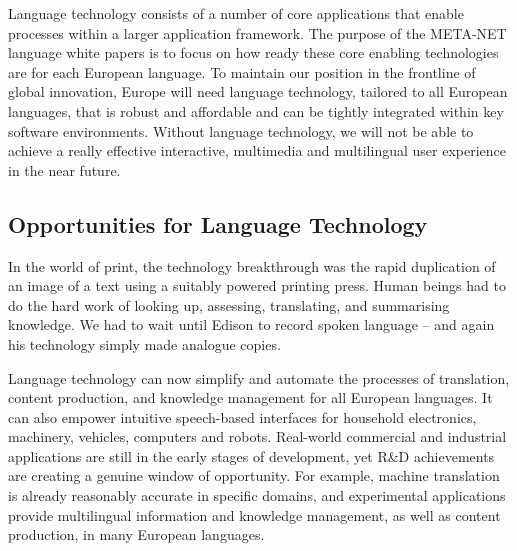 \documentclass{../../metanetpaper}
\begin{document}
\begin{multicols}{2}
Language technology consists of a number of core applications that enable processes within a larger application framework. The purpose of the META-NET language white papers is to focus on how ready these core enabling technologies are for each European language.  To maintain our position in the frontline of global innovation, Europe will need language technology, tailored to all European languages, that is robust and affordable and can be tightly integrated within key software environments. Without language technology, we will not be able to achieve a really effective interactive, multimedia and multilingual user experience in the near future.

\subsection{Opportunities for Language Technology}

In the world of print, the technology breakthrough was the rapid duplication of an image of a text using a suitably powered printing press. Human beings had to do the hard work of looking up, assessing, translating, and summarising knowledge. We had to wait until Edison to record spoken language -- and again his technology simply made analogue copies.

Language technology can now simplify and automate the processes of translation, content production, and knowledge management for all European languages. It can also empower intuitive speech-based interfaces for household electronics, machinery, vehicles, computers and robots. Real-world commercial and industrial applications are still in the early stages of development, yet R\&D achievements are creating a genuine window of opportunity. For example, machine translation is already reasonably accurate in specific domains, and experimental applications provide multilingual information and knowledge management, as well as content production, in many European languages. 


\end{multicols}
\end{document}
